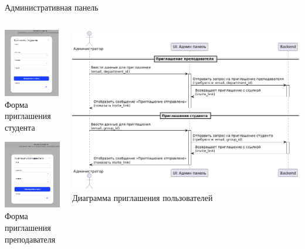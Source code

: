 \documentclass[aspectratio=169]{beamer}
\begin{document}
\begin{frame}{Административная панель}
\vspace{0.5em}

\begin{columns}
    \begin{column}{0.5\textwidth}
        \centering
        \includegraphics[height=3cm]{static/InviteStudentPage.png} \\
        \small Форма приглашения студента

        \vspace{1em}

        \includegraphics[height=3cm]{static/InviteTeacherPage.png} \\
        \small Форма приглашения преподавателя
    \end{column}
    \begin{column}{0.5\textwidth}
        \centering
        \includegraphics[width=0.95\linewidth]{static/Admin.png} \\
        \small Диаграмма приглашения пользователей 
    \end{column}
\end{columns}
\end{frame}
\end{document}
